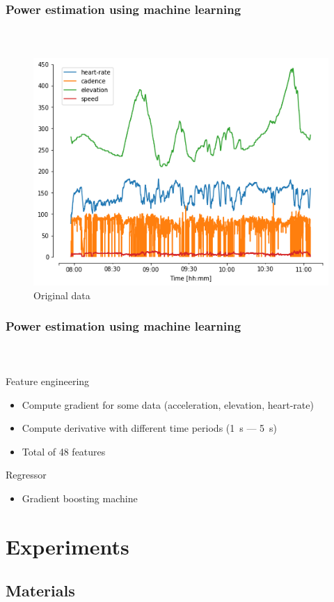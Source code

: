\documentclass{beamer}
\begin{document}
\begin{frame}
  \frametitle{Power estimation using machine learning}
  \framesubtitle{\ }
  \begin{figure}
    \includegraphics[width=.7\textwidth]{./images/original_data.png}
    \caption{Original data}
  \end{figure}
\end{frame}

\begin{frame}
  \frametitle{Power estimation using machine learning}
  \framesubtitle{\ }
  \begin{block}{Feature engineering}
    \begin{itemize}
    \item Compute gradient for some data (acceleration, elevation, heart-rate)
    \item Compute derivative with different time periods (\SI{1}{\second} ---
      \SI{5}{\second})
    \item Total of 48 features
    \end{itemize}
  \end{block}
  \begin{block}{Regressor}
    \begin{itemize}
    \item Gradient boosting machine
    \end{itemize}
  \end{block}
\end{frame}

\section{Experiments}

\subsection{Materials}
\end{document}
